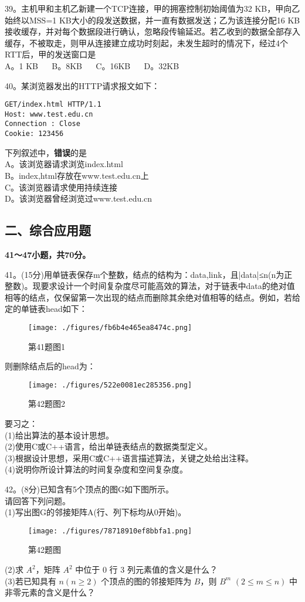 39。主机甲和主机乙新建一个TCP连接，甲的拥塞控制初始阈值为32 KB，甲向乙始终以MSS=1 KB大小的段发送数据，并一直有数据发送；乙为该连接分配16 KB接收缓存，并对每个数据段进行确认，忽略段传输延迟。若乙收到的数据全部存入缓存，不被取走，则甲从连接建立成功时刻起，未发生超时的情况下，经过4个RTT后，甲的发送窗口是 \\
A。1 KB $\quad$ B。8KB $\quad$ C。16KB $\quad$ D。32KB

40。某浏览器发出的HTTP请求报文如下： \\
\begin{lstlisting}[language=none]
GET/index.html HTTP/1.1
Host: www.test.edu.cn
Connection : Close
Cookie: 123456
\end{lstlisting}
下列叙述中，\textbf{错误}的是 \\
A。该浏览器请求浏览index.html \\
B。index,html存放在www.test.edu.cn上 \\
C。该浏览器请求使用持续连接 \\
D。该浏览器曾经浏览过www.test.edu.cn

\subsection{二、综合应用题}
\textbf{41～47小题，共70分。}

41。(15分)用单链表保存m个整数，结点的结构为：data,link，且|data|≤n(n为正整数)。现要求设计一个时间复杂度尽可能高效的算法，对于链表中data的绝对值相等的结点，仅保留第一次出现的结点而删除其余绝对值相等的结点。例如，若给定的单链表head如下：
\begin{figure}[ht]
\centering
\texttt{[image: ./figures/fb6b4e465ea8474c.png]}
\caption{第41题图1} \label{fig_CSN15_3}
\end{figure}
则删除结点后的head为：
\begin{figure}[ht]
\centering
\texttt{[image: ./figures/522e0081ec285356.png]}
\caption{第42题图2} \label{fig_CSN15_4}
\end{figure}
要习之： \\
(1)给出算法的基本设计思想。 \\
(2)使用C或C++语言，给出单链表结点的数据类型定义。 \\
(3)根据设计思想，采用C或C++语言描述算法，关键之处给出注释。 \\
(4)说明你所设计算法的时间复杂度和空间复杂度。

42。(8分)已知含有5个顶点的图G如下图所示。 \\
请回答下列问题。 \\
(1)写出图G的邻接矩阵A(行、列下标均从0开始)。
\begin{figure}[ht]
\centering
\texttt{[image: ./figures/78718910ef8bbfa1.png]}
\caption{第42题图} \label{fig_CSN15_5}
\end{figure}
(2)求 $A^2$，矩阵 $A^2$ 中位于 $0$ 行 $3$ 列元素值的含义是什么？ \\
(3)若已知具有 $n(n\geqslant2)$ 个顶点的图的邻接矩阵为 $B$，则 $B^m$ $(2\leqslant m\leqslant n)$ 中非零元素的含义是什么？


